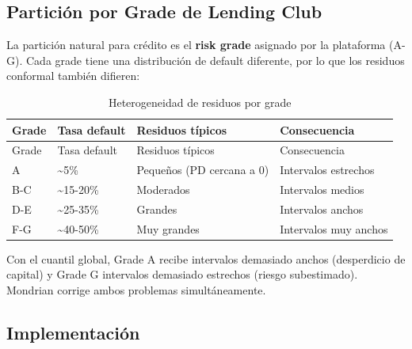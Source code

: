 \documentclass[
  spanish,
  11pt,
  letterpaper,
]{scrbook}
\theoremstyle{plain}
\theoremstyle{remark}
\begin{document}
\subsection{Partición por Grade de Lending
Club}\label{particiuxf3n-por-grade-de-lending-club}

La partición natural para crédito es el \textbf{risk grade} asignado por
la plataforma (A-G). Cada grade tiene una distribución de default
diferente, por lo que los residuos conformal también difieren:

\begin{longtable}[]{@{}llll@{}}
\caption{Heterogeneidad de residuos por
grade}\label{tbl-residuos-por-grade}\tabularnewline
\toprule\noalign{}
Grade & Tasa default & Residuos típicos & Consecuencia \\
\midrule\noalign{}
\endfirsthead
\toprule\noalign{}
Grade & Tasa default & Residuos típicos & Consecuencia \\
\midrule\noalign{}
\endhead
\bottomrule\noalign{}
\endlastfoot
A & \textasciitilde5\% & Pequeños (PD cercana a 0) & Intervalos
estrechos \\
B-C & \textasciitilde15-20\% & Moderados & Intervalos medios \\
D-E & \textasciitilde25-35\% & Grandes & Intervalos anchos \\
F-G & \textasciitilde40-50\% & Muy grandes & Intervalos muy anchos \\
\end{longtable}

Con el cuantil global, Grade A recibe intervalos demasiado anchos
(desperdicio de capital) y Grade G intervalos demasiado estrechos
(riesgo subestimado). Mondrian corrige ambos problemas simultáneamente.

\subsection{Implementación}\label{implementaciuxf3n}
\end{document}
